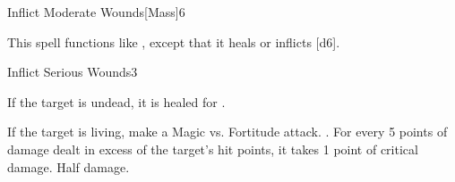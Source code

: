 \begin{spellsection}{Inflict Moderate Wounds}[Mass]{6}
    \begin{spellheader}
    \end{spellheader}
    \begin{spellcontent}
        \begin{spelltargetinginfo}
        \end{spelltargetinginfo}
        \begin{spelleffects}
            \spellspecial This spell functions like , except that it heals or inflicts [d6].
        \end{spelleffects}
    \end{spellcontent}
    \begin{spellfooter}
        \miscastexplode
    \end{spellfooter}
\end{spellsection}

\begin{spellsection}{Inflict Serious Wounds}{3}
    \begin{spellheader}
    \end{spellheader}
    \begin{spellcontent}
        \begin{spelltargetinginfo}
        \end{spelltargetinginfo}
        \begin{spelleffects}
            \spelleffect If the target is undead, it is healed for .
            \begin{spellattacktriggered}{If the target is living, make a Magic vs. Fortitude attack.}
                \spellsuccess {}. For every 5 points of damage dealt in excess of the target's hit points, it takes 1 point of critical damage.
                \spellfailure Half damage.
            \end{spellattacktriggered}
        \end{spelleffects}
    \end{spellcontent}
    \begin{spellfooter}
        \miscastrandom
    \end{spellfooter}
\end{spellsection}

